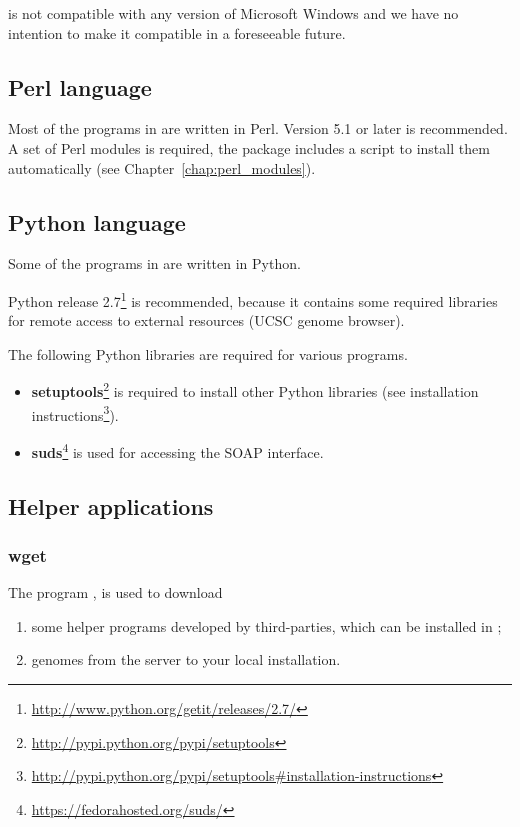 \documentclass[12pt,a4paper, oneside]{scrreprt} %
\begin{document}
\RSAT is not compatible with any version of Microsoft Windows and we
have no intention to make it compatible in a foreseeable future.

\subsection{Perl language}

Most of the programs in \RSAT are written in Perl. Version 5.1 or
later is recommended. A set of Perl modules is required, the \RSAT
package includes a script to install them automatically (see
Chapter~\ref{chap:perl_modules}).

\subsection{Python language}

Some of the programs in \RSAT are written in Python. 

Python release
2.7\footnote{\url{http://www.python.org/getit/releases/2.7/}} is
recommended, because it contains some required libraries for remote
access to external resources (UCSC genome browser).

The following Python libraries are required for various programs.

\begin{itemize}
\item
  \textbf{setuptools}\footnote{\url{http://pypi.python.org/pypi/setuptools}}
  is required to install other Python libraries (see installation
  instructions\footnote{\url{http://pypi.python.org/pypi/setuptools\#installation-instructions}}).

\item \textbf{suds}\footnote{\url{https://fedorahosted.org/suds/}} is
  used for accessing the SOAP interface.

\end{itemize}


\subsection{Helper applications}



\subsubsection{wget}

The program , is used  to download
\begin{enumerate}

\item some helper programs developed by third-parties, which can be
  installed in \RSAT;

\item genomes from the \RSAT server to your local \RSAT installation.

\end{enumerate}
\end{document}
